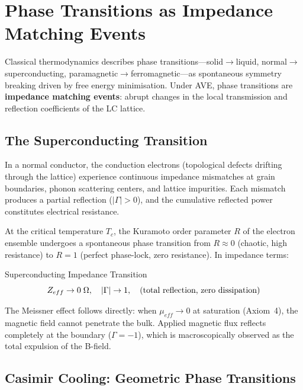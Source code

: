 \section{Phase Transitions as Impedance Matching Events}
\label{sec:phase_transitions}

Classical thermodynamics describes phase transitions---solid$\to$liquid, normal$\to$superconducting, paramagnetic$\to$ferromagnetic---as spontaneous symmetry breaking driven by free energy minimisation. Under AVE, phase transitions are \textbf{impedance matching events}: abrupt changes in the local transmission and reflection coefficients of the LC lattice.

\subsection{The Superconducting Transition}

In a normal conductor, the conduction electrons (topological defects drifting through the lattice) experience continuous impedance mismatches at grain boundaries, phonon scattering centers, and lattice impurities. Each mismatch produces a partial reflection ($|\Gamma| > 0$), and the cumulative reflected power constitutes electrical resistance.

At the critical temperature $T_c$, the Kuramoto order parameter $R$ of the electron ensemble undergoes a spontaneous phase transition from $R \approx 0$ (chaotic, high resistance) to $R = 1$ (perfect phase-lock, zero resistance). In impedance terms:
\begin{resultbox}{Superconducting Impedance Transition}
\begin{equation}
    Z_{eff} \to 0 \;\Omega, \quad |\Gamma| \to 1{}, \quad \text{(total reflection, zero dissipation)}
    \label{eq:superconducting_impedance}
\end{equation}
\end{resultbox}

The Meissner effect follows directly: when $\mu_{eff} \to 0$ at saturation (Axiom~4), the magnetic field cannot penetrate the bulk. Applied magnetic flux reflects completely at the boundary ($\Gamma = -1$\gammaundeclared{}), which is macroscopically observed as the total expulsion of the B-field.

\subsection{Casimir Cooling: Geometric Phase Transitions}

